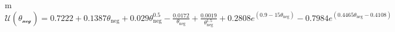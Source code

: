 \begin{table}[!htbp]
\begin{threeparttable}
\begin{tablenotes}
            \begin{footnotesize}
            \item[m] $\mathcal{U(\theta_\text{neg})} = 0.7222 + 0.1387\theta_\text{neg} + 0.029\theta_\text{neg}^{0.5} - \frac{0.0172}{\theta_\text{neg}} + \frac{0.0019}{\theta_\text{neg}^{1.5}} + 0.2808 e^{(0.9 - 15\theta_\text{neg})} - 0.7984 e^{(0.4465\theta_\text{neg} - 0.4108)}$\vfill
            \end{footnotesize}
        \end{tablenotes}
    \end{threeparttable}
\end{table}


